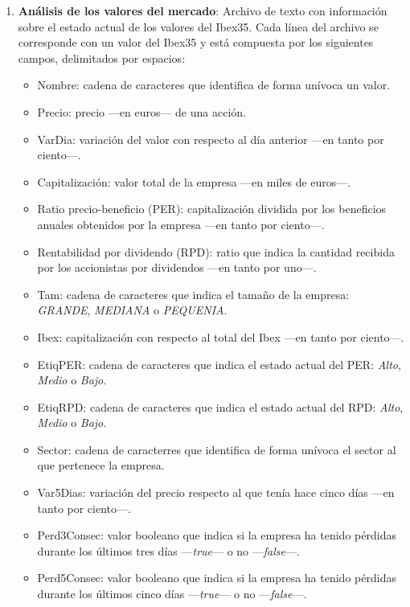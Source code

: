 \documentclass[a4paper, 11pt, titlepage]{article}
\theoremstyle{definition}
\begin{document}
\begin{enumerate}
        \item \textbf{Análisis de los valores del mercado}: Archivo de texto con información sobre el estado actual de  los valores del Ibex35. Cada línea del archivo se corresponde con un valor del Ibex35 y está compuesta por los siguientes campos, delimitados por espacios:
        \begin{itemize}
            \item Nombre: cadena de caracteres que identifica de forma unívoca un valor.
            \item Precio: precio ---en euros--- de una acción.
            \item VarDia: variación del valor con respecto al día anterior ---en tanto por ciento---.
            \item Capitalización: valor total de la empresa ---en miles de euros---.
            \item Ratio precio-beneficio (PER): capitalización dividida por los beneficios anuales obtenidos por la empresa ---en tanto por ciento---.
            \item Rentabilidad por dividendo (RPD): ratio que indica la cantidad recibida por los accionistas por dividendos ---en tanto por uno---.
            \item Tam: cadena de caracteres que indica el tamaño de la empresa: \emph{GRANDE}, \emph{MEDIANA} o \emph{PEQUENIA}.
            \item Ibex: capitalización con respecto al total del Ibex ---en tanto por ciento---.
            \item EtiqPER: cadena de caracteres que indica el estado actual del PER: \emph{Alto}, \emph{Medio} o \emph{Bajo}.
            \item EtiqRPD: cadena de caracteres que indica el estado actual del RPD: \emph{Alto}, \emph{Medio} o \emph{Bajo}.
            \item Sector: cadena de caracterres que identifica de forma unívoca el sector al que pertenece la empresa.
            \item Var5Dias: variación del precio respecto al que tenía hace cinco días ---en tanto por ciento---.
            \item Perd3Consec: valor booleano que indica si la empresa ha tenido pérdidas durante los últimos tres días ---\emph{true}--- o no ---\emph{false}---.
            \item Perd5Consec: valor booleano que indica si la empresa ha tenido pérdidas durante los últimos cinco días ---\emph{true}--- o no ---\emph{false}---.

\end{itemize}
\end{enumerate}
\end{document}
